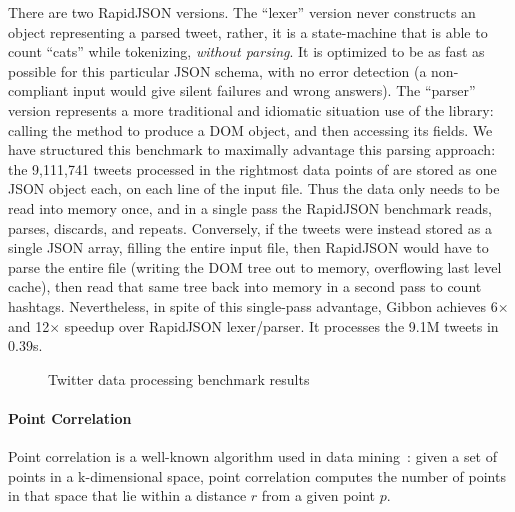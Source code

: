 There are two RapidJSON versions. The ``lexer'' version never constructs an
object representing a parsed tweet, rather, it is a state-machine
that is able to count ``cats'' while tokenizing, {\em without parsing}.  It is
optimized to be as fast as possible for this particular JSON schema, with no
error detection (a non-compliant input would give silent failures and wrong
answers).
%
The ``parser'' version represents a more traditional and idiomatic situation use
of the library: calling the  method to produce a DOM object, and
then accessing its fields.
%
We have structured this benchmark to maximally advantage this parsing approach:
the 9,111,741 tweets processed in the rightmost data points of  are stored as one JSON object each, on each line of the input file.
%
Thus the data only needs to be read into memory once, and in a single pass the RapidJSON benchmark reads, parses, discards, and repeats.
%
Conversely, if the tweets were instead stored as a single JSON array, filling
the entire input file, then RapidJSON would have to parse the entire file
(writing the DOM tree out to memory, overflowing last level cache), then read
that same tree back into memory in a second pass to count hashtags.
%
Nevertheless, in spite of this single-pass advantage, Gibbon achieves
6$\times$ and 12$\times$ speedup over RapidJSON lexer/parser.
%
It processes the 9.1M tweets in 0.39s.


\begin{figure}
  \centering
  
  \caption{Twitter data processing benchmark results}
  \label{fig:twitter_slowdown_plot}
\end{figure}

\paragraph{Point Correlation}

Point correlation  is a well-known algorithm used in data mining~\cite{gray2000n}:
given a set of points in a k-dimensional space, point correlation computes the number of points in that space  that lie within a
distance $r$ from a given point $p$.


